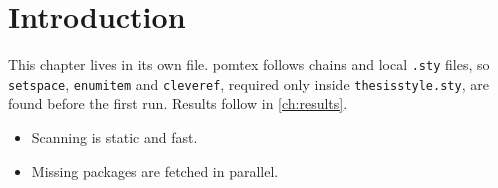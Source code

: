 \chapter{Introduction}\label{ch:intro}
This chapter lives in its own file. pomtex follows \verb|| chains and
local \texttt{.sty} files, so \texttt{setspace}, \texttt{enumitem} and
\texttt{cleveref}, required only inside \texttt{thesisstyle.sty}, are found
before the first run. Results follow in \cref{ch:results}.
\begin{itemize}
  \item Scanning is static and fast.
  \item Missing packages are fetched in parallel.
\end{itemize}
